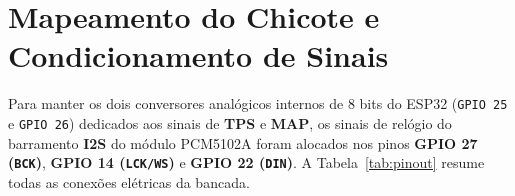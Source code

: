 \documentclass[12pt,a4paper]{article}
\begin{document}
\section{Mapeamento do Chicote e Condicionamento de Sinais}

Para manter os dois conversores analógicos internos de 8 bits do ESP32 (\texttt{GPIO 25} e \texttt{GPIO 26}) dedicados aos sinais de \textbf{TPS} e \textbf{MAP}, os sinais de relógio do barramento \textbf{I2S} do módulo PCM5102A foram alocados nos pinos \textbf{GPIO 27 (\texttt{BCK})}, \textbf{GPIO 14 (\texttt{LCK/WS})} e \textbf{GPIO 22 (\texttt{DIN})}. A Tabela~\ref{tab:pinout} resume todas as conexões elétricas da bancada.
\end{document}

